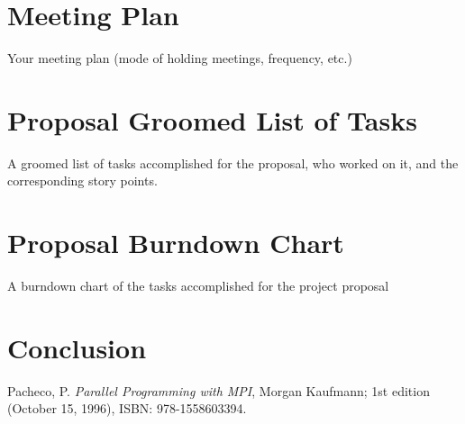 \documentclass[conference]{IEEEtran}
\begin{document}
\section{Meeting Plan}
Your meeting plan (mode of holding meetings, frequency, etc.)

\section{Proposal Groomed List of Tasks}
A groomed list of tasks accomplished for the proposal, who worked on it, and the corresponding story points.

\section{Proposal Burndown Chart}
A burndown chart of the tasks accomplished for the project proposal

\section{Conclusion}



\begin{thebibliography}{1}  

 Pacheco, P. \emph{Parallel Programming with MPI}, Morgan Kaufmann; 1st edition (October 15, 1996), ISBN: 978-1558603394.

\end{thebibliography}
\end{document}
